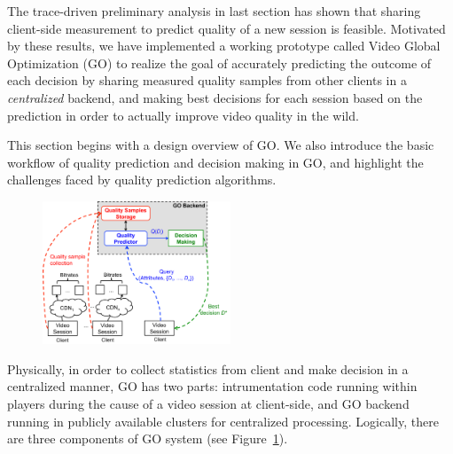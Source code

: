 

 The trace-driven preliminary analysis in last section has shown that sharing client-side measurement to predict quality of a new session is feasible. Motivated by these results, we have implemented a working prototype called Video Global Optimization (GO) to realize the goal of accurately predicting the outcome of each decision by sharing measured quality samples from other clients in a {\it centralized} backend, and making best decisions for each session based on the prediction in order to actually improve video quality in the wild.

 This section begins with a design overview of GO. We also introduce the basic workflow of quality prediction and decision making in GO, and highlight the challenges faced by quality prediction algorithms. 



\begin{figure}[h!]
\centering
 \includegraphics[width=0.5\textwidth] {figures/go-overview.pdf}
\label{fig:go-overview}
\end{figure}

 Physically, in order to collect statistics from client and make decision in a centralized manner, GO has two parts: intrumentation code running within players during the cause of a video session at client-side, and GO backend running in publicly available clusters for centralized processing. Logically, there are three components of GO system (see Figure~\ref{fig:go-overview}). 

